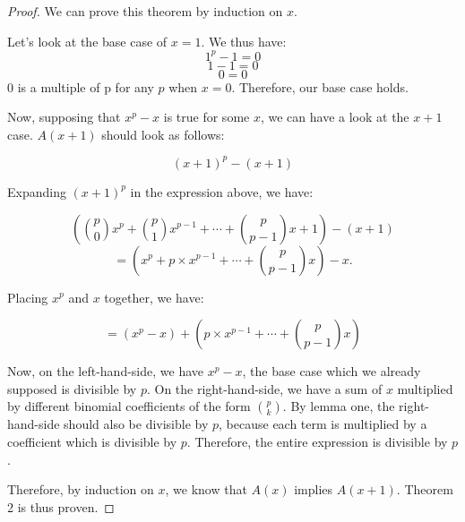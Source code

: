 \documentclass[11pt,reqno,oneside,a4paper]{article}
\begin{document}
\begin{proof}
We can prove this theorem by induction on $x$.

Let's look at the base case of $x = 1$. We thus have:
$$1^p - 1 = 0$$
$$1 - 1 = 0$$
$$0 = 0$$
0 is a multiple of p for any $p$ when $x = 0$. Therefore, our base case holds.

Now, supposing that $x^p - x$ is true for some $x$, we can have a look at the $x + 1$ case. $A(x + 1)$ should look as follows:

$$(x + 1)^p - (x+1)$$

Expanding $(x+1)^p$ in the expression above, we have:

$$\left(\binom{p}{0}x^p + \binom{p}{1}x^{p-1} + \cdots + \binom{p}{p-1}x + 1\right) - (x + 1) $$
$$ = \left(x^p + p \times x^{p-1} + \cdots + \binom{p}{p-1}x\right) - x. $$

Placing $x^p$ and $x$ together, we have:

$$ = (x^p - x) + \left(p \times x^{p-1} + \cdots + \binom{p}{p-1}x\right) $$

Now, on the left-hand-side, we have $x^p - x$, the base case which we already supposed is divisible by $p$. On the right-hand-side, we have a sum of $x$ multiplied by different binomial coefficients of the form $\binom{p}{k}$. By lemma one, the right-hand-side should also be divisible by $p$, because each term is multiplied by a coefficient which is divisible by $p$. Therefore, the entire expression is divisible by $p$.

Therefore, by induction on $x$, we know that $A(x)$ implies $A(x+1)$. Theorem 2 is thus proven.

\end{proof}
\end{document}
